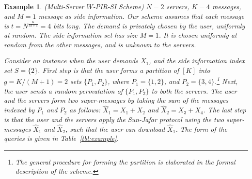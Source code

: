 \documentclass[letterpaper, 10 pt, conference]{ieeeconf}
\newcommand\salim[1]{\add[salim]{#1}}
\newtheorem{example}{Example}
\newcommand{\Xj}[1]{X_{#1}} %
\newcommand{\GF}[1]{\mathbb{F}_{#1}} %
\begin{document}
\begin{example} 
(Multi-Server $W$-PIR-SI Scheme) $N = 2$ servers, $K = 4$ messages, and $M = 1$ message as side information. %
Our scheme assumes that each message is $t = N^{\frac{K}{M+1}} = 4$ bits long. The  demand is privately chosen by the user, uniformly at random. The side information set has size $M = 1$. It is chosen uniformly at random from the other messages, and is unknown to the servers. 

Consider an instance when the user demands $X_1$, and the side information index  set $S = \{2\}$. First step is that the user forms a partition of $[K]$ into $g = K/(M+1) = 2$ sets $\{P_1,P_2\}$, where $P_1 = \{1,2\}$, and $P_2 = \{3,4\}$.\footnote{The general procedure for forming the partition is elaborated in the formal description of the scheme.} Next, the user sends a random permutation of $\{P_1,P_2\}$ to both the servers. The user and the servers form two {\it super-messages} by taking the sum of the messages indexed by $P_1$ and $P_2$ as follows: $\hat{X}_1 = \Xj{1} + \Xj{2}$ and $\hat{X}_2 = \Xj{3} + \Xj{4}$. %
The last step is that the user and the servers apply the Sun-Jafar protocol using the two super-messages $\hat{X}_1$ and $\hat{X}_2$, such that the user can download $\hat{X}_1$. The form of the queries is given in Table~\ref{tbl:example}.



\end{example}
\end{document}
